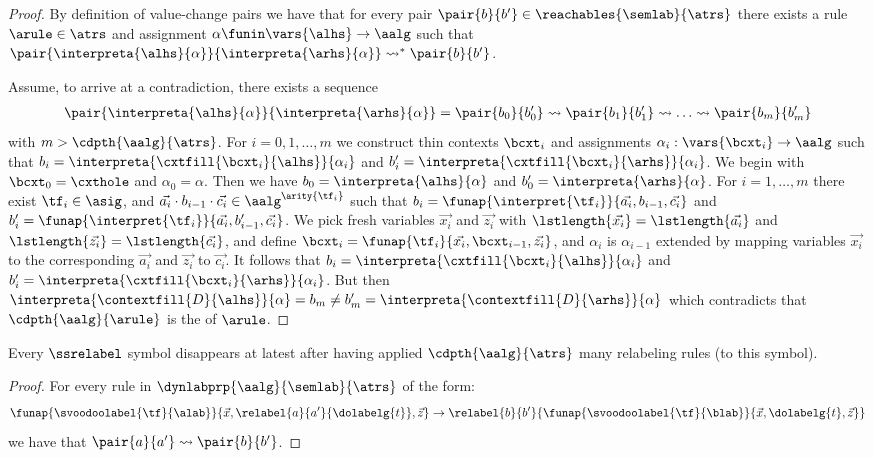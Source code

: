 \begin{proof}
  By definition of value-change pairs we have that for every pair $\pair{b}{b'} \in \reachables{\semlab}{\atrs}$
  there exists a rule $\arule \in \atrs$ and assignment $\alpha \funin \vars{\alhs} \to \aalg$
  such that $\pair{\interpreta{\alhs}{\alpha}}{\interpreta{\arhs}{\alpha}} \reachrel^* \pair{b}{b'}$.
  
  Assume, to arrive at a contradiction, there exists a sequence 
  \begin{align*}
   \pair{\interpreta{\alhs}{\alpha}}{\interpreta{\arhs}{\alpha}} 
   = \pair{b_0}{b'_0} \reachrel \pair{b_1}{b'_1} \reachrel \ldots \reachrel \pair{b_m}{b'_m}
  \end{align*}
  with $m > \cdpth{\aalg}{\atrs}$.
  For $i = 0,1,\ldots,m$ we construct thin contexts $\bcxt_i$ 
  and assignments $\alpha_i : \vars{\bcxt_i} \to \aalg$ 
  such that 
  $b_i = \interpreta{\cxtfill{\bcxt_i}{\alhs}}{\alpha_i}$
  and $b'_i = \interpreta{\cxtfill{\bcxt_i}{\arhs}}{\alpha_i}$.
  We begin with $\bcxt_0 = \cxthole$ and $\alpha_0 = \alpha$.
  Then we have $b_0 = \interpreta{\alhs}{\alpha}$ and $b'_0 = \interpreta{\arhs}{\alpha}$.
  For $i = 1,\ldots,m$ there exist
  $\tf_i \in \asig$, and $\vec{a_i} \cdot b_{i-1} \cdot \vec{c_i} \in \aalg^{\arity{\tf_i}}$
  such that
  $b_i = \funap{\interpret{\tf_i}}{\vec{a_i},b_{i-1},\vec{c_i}}$
  and $b'_i = \funap{\interpret{\tf_i}}{\vec{a_i},b'_{i-1},\vec{c_i}}$.
  We pick fresh variables $\vec{x_i}$ and $\vec{z_i}$
  with $\lstlength{\vec{x_i}} = \lstlength{\vec{a_i}}$ and $\lstlength{\vec{z_i}} = \lstlength{\vec{c_i}}$,
  and define $\bcxt_i = \funap{\tf_i}{\vec{x_i},\bcxt_{i-1},\vec{z_i}}$,
  and $\alpha_i$ is $\alpha_{i-1}$ extended by
  mapping variables $\vec{x_i}$ to the corresponding $\vec{a_i}$ and $\vec{z_i}$ to $\vec{c_i}$.
  It follows that $b_i = \interpreta{\cxtfill{\bcxt_i}{\alhs}}{\alpha_i}$
  and $b'_i = \interpreta{\cxtfill{\bcxt_i}{\arhs}}{\alpha_i}$.
  But then
  $\interpreta{\contextfill{D}{\alhs}}{\alpha} = b_m \ne b_m' = \interpreta{\contextfill{D}{\arhs}}{\alpha}$
  which contradicts that $\cdpth{\aalg}{\arule}$ is the \cdepth{} of $\arule$.
\end{proof}



\begin{corollary}
  Every $\ssrelabel$ symbol disappears at latest 
  after having applied $\cdpth{\aalg}{\atrs}$ many 
  relabeling rules (to this symbol).
\end{corollary}
\begin{proof}
  For every rule in $\dynlabprp{\aalg}{\semlab}{\atrs}$ of the form:
  \begin{align*}
    \funap{\svoodoolabel{\tf}{\alab}}{\vec{x},\relabel{a}{a'}{\dolabelg{t}},\vec{z}}
    \to \relabel{b}{b'}{\funap{\svoodoolabel{\tf}{\blab}}{\vec{x},\dolabelg{t},\vec{z}}}
  \end{align*}
  we have that $\pair{a}{a'} \reachrel \pair{b}{b'}$.
\end{proof}

